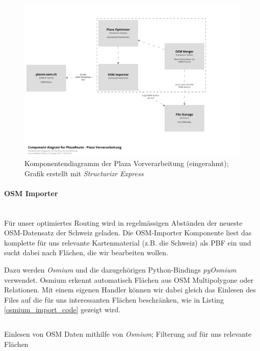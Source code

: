 \begin{figure}[ht]
\centering
\includegraphics[width=1\linewidth]{projectdoc/img/component_diagram_plaza-vorverarbeitung.png}
\caption[Komponentendiagramm Vorverarbeitung]{Komponentendiagramm der Plaza Vorverarbeitung (eingerahmt); Grafik erstellt mit \emph{Structurizr Express}\cite{structurizr}}
\label{fig:component_diagram_vorverarbeitung}
\end{figure}


\paragraph{OSM Importer}\label{par:OSM Importer}~\\
Für unser optimiertes Routing wird in regelmässigen Abständen der neueste \ac{OSM}-Datensatz \cite{osm_data_switzerland} der Schweiz geladen. Die \acs{OSM}-Importer Komponente liest das komplette für uns relevante Kartenmaterial (z.B. die Schweiz) als \ac{PBF} ein und sucht dabei nach Flächen, die wir bearbeiten wollen.

Dazu werden \emph{Osmium} und die dazugehörigen Python-Bindings \emph{pyOsmium}\cite{pyosmium} verwendet. Osmium erkennt automatisch Flächen aus \ac{OSM} Multipolygone oder Relationen. Mit einem eigenen Handler können wir dabei gleich das Einlesen des Files auf die für uns interessanten Flächen beschränken, wie in Listing \ref{osmium_import_code} gezeigt wird.


\begin{listing}[ht]
    \inputminted{python}{projectdoc/listing/osmium_handler.py}
    \caption[Einlesen OSM-Daten mit Osmium]{Einlesen von OSM Daten mithilfe von \emph{Osmium}; Filterung auf für uns relevante Flächen}
    \label{osmium_import_code}
\end{listing}

